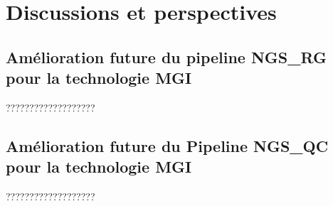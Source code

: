 \section{Discussions et perspectives}
\subsection{Amélioration future du pipeline NGS\_RG pour la technologie MGI}
???????????????????

\subsection{Amélioration future du Pipeline NGS\_QC pour la technologie MGI}
???????????????????